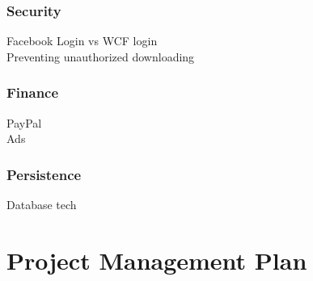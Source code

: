 \subsubsection{Security}
Facebook Login vs WCF login\\
Preventing unauthorized downloading\\
\subsubsection{Finance}
PayPal\\
Ads\\
\subsubsection{Persistence}
Database tech

\section{Project Management Plan}